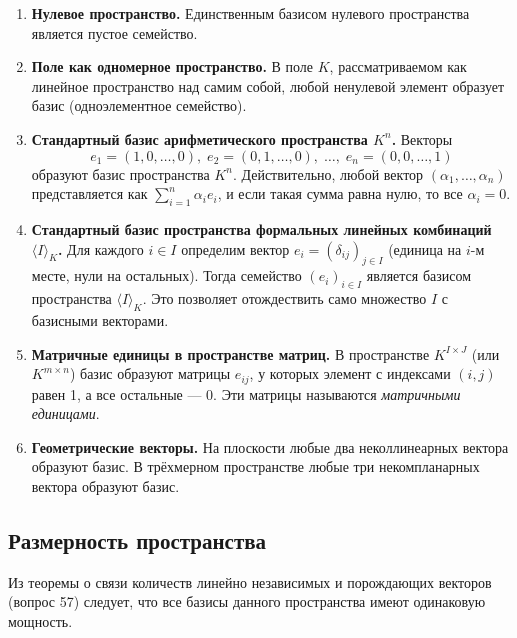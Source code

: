 \documentclass[a4paper,12pt]{article}
\theoremstyle{definition}
\theoremstyle{plain}
\theoremstyle{remark}
\begin{document}
	\begin{enumerate}
		\item \textbf{Нулевое пространство.} Единственным базисом нулевого пространства является пустое семейство.
		
		\item \textbf{Поле как одномерное пространство.} В поле \( K \), рассматриваемом как линейное пространство над самим собой, любой ненулевой элемент образует базис (одноэлементное семейство).
		
		\item \textbf{Стандартный базис арифметического пространства \( K^n \).} Векторы
		\[
		e_1 = (1,0,\dots,0),\; e_2 = (0,1,\dots,0),\; \dots,\; e_n = (0,0,\dots,1)
		\]
		образуют базис пространства \( K^n \). Действительно, любой вектор \( (\alpha_1,\dots,\alpha_n) \) представляется как \( \sum_{i=1}^n \alpha_i e_i \), и если такая сумма равна нулю, то все \( \alpha_i = 0 \).
		
		\item \textbf{Стандартный базис пространства формальных линейных комбинаций \( \langle I \rangle_K \).} Для каждого \( i \in I \) определим вектор \( e_i = (\delta_{ij})_{j \in I} \) (единица на \( i \)-м месте, нули на остальных). Тогда семейство \( (e_i)_{i \in I} \) является базисом пространства \( \langle I \rangle_K \). Это позволяет отождествить само множество \( I \) с базисными векторами.
		
		\item \textbf{Матричные единицы в пространстве матриц.} В пространстве \( K^{I \times J} \) (или \( K^{m \times n} \)) базис образуют матрицы \( e_{ij} \), у которых элемент с индексами \( (i,j) \) равен 1, а все остальные — 0. Эти матрицы называются \textit{матричными единицами}.
		
		\item \textbf{Геометрические векторы.} На плоскости любые два неколлинеарных вектора образуют базис. В трёхмерном пространстве любые три некомпланарных вектора образуют базис.
	\end{enumerate}
	
	\subsection{Размерность пространства}
	
	Из теоремы о связи количеств линейно независимых и порождающих векторов (вопрос 57) следует, что все базисы данного пространства имеют одинаковую мощность.
	
\end{document}

